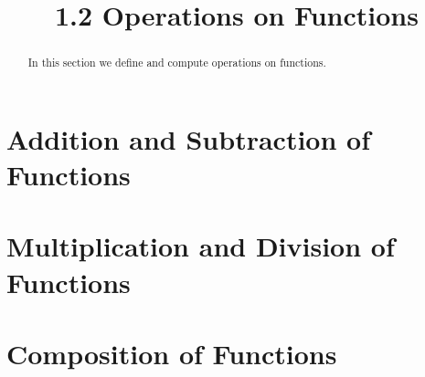 \documentclass[handout]{ximera}
\title{1.2 Operations on Functions}
\begin{document}
\begin{abstract}
In this section we define and compute operations on functions.
\end{abstract}

\maketitle


\section{Addition and Subtraction of Functions}




\section{Multiplication and Division of Functions}


\section{Composition of Functions}
\end{document}
